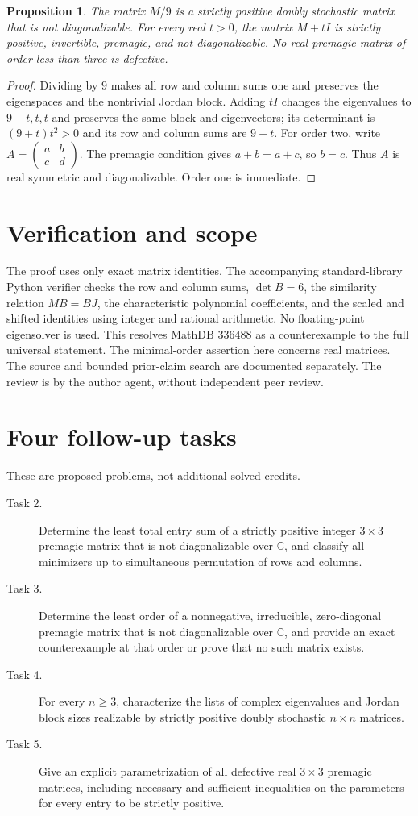 \documentclass[11pt]{article}
\newtheorem{proposition}{Proposition}
\begin{document}
\begin{proposition}
The matrix $M/9$ is a strictly positive doubly stochastic matrix that
is not diagonalizable. For every real $t>0$, the matrix $M+tI$ is
strictly positive, invertible, premagic, and not diagonalizable.
No real premagic matrix of order less than three is defective.
\end{proposition}
\begin{proof}
Dividing by $9$ makes all row and column sums one and preserves the
eigenspaces and the nontrivial Jordan block. Adding $tI$ changes the
eigenvalues to $9+t,t,t$ and preserves the same block and eigenvectors;
its determinant is $(9+t)t^2>0$ and its row and column sums are $9+t$.
For order two, write $A=\left(\begin{smallmatrix}a&b\\c&d\end{smallmatrix}\right)$.
The premagic condition gives $a+b=a+c$, so $b=c$. Thus $A$ is real
symmetric and diagonalizable. Order one is immediate.
\end{proof}

\section*{Verification and scope}
The proof uses only exact matrix identities. The accompanying
standard-library Python verifier checks the row and column sums,
$\det B=6$, the similarity relation $MB=BJ$, the characteristic
polynomial coefficients, and the scaled and shifted identities using
integer and rational arithmetic. No floating-point eigensolver is used.
This resolves MathDB 336488 as a counterexample to the full universal
statement. The minimal-order assertion here concerns real matrices.
The source and bounded prior-claim search are documented separately.
The review is by the author agent, without independent peer review.

\section*{Four follow-up tasks}
These are proposed problems, not additional solved credits.
\begin{description}
\item[Task 2.] Determine the least total entry sum of a strictly positive
integer $3\times3$ premagic matrix that is not diagonalizable over
$\mathbb C$, and classify all minimizers up to simultaneous permutation
of rows and columns.
\item[Task 3.] Determine the least order of a nonnegative, irreducible,
zero-diagonal premagic matrix that is not diagonalizable over
$\mathbb C$, and provide an exact counterexample at that order or prove
that no such matrix exists.
\item[Task 4.] For every $n\ge3$, characterize the lists of complex
eigenvalues and Jordan block sizes realizable by strictly positive
doubly stochastic $n\times n$ matrices.
\item[Task 5.] Give an explicit parametrization of all defective real
$3\times3$ premagic matrices, including necessary and sufficient
inequalities on the parameters for every entry to be strictly positive.
\end{description}
\end{document}
